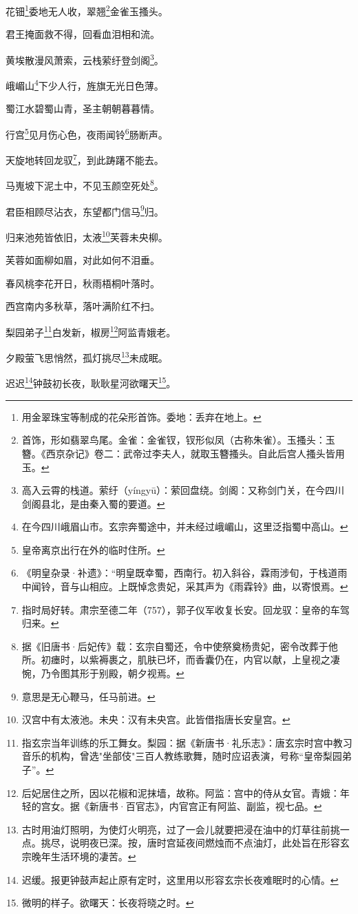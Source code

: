 \documentclass[UTF8]{ctexart}
\begin{document}
花钿\footnote{用金翠珠宝等制成的花朵形首饰。委地：丢弃在地上。}委地无人收，翠翘\footnote{首饰，形如翡翠鸟尾。金雀：金雀钗，钗形似凤（古称朱雀）。玉搔头：玉簪。《西京杂记》卷二：武帝过李夫人，就取玉簪搔头。自此后宫人搔头皆用玉。}金雀玉搔头。

君王掩面救不得，回看血泪相和流。

黄埃散漫风萧索，云栈萦纡登剑阁\footnote{高入云霄的栈道。萦纡（yíngyū）：萦回盘绕。剑阁：又称剑门关，在今四川剑阁县北，是由秦入蜀的要道。}。

峨嵋山\footnote{在今四川峨眉山市。玄宗奔蜀途中，并未经过峨嵋山，这里泛指蜀中高山。}下少人行，旌旗无光日色薄。

蜀江水碧蜀山青，圣主朝朝暮暮情。

行宫\footnote{皇帝离京出行在外的临时住所。}见月伤心色，夜雨闻铃\footnote{《明皇杂录·补遗》：“明皇既幸蜀，西南行。初入斜谷，霖雨涉旬，于栈道雨中闻铃，音与山相应。上既悼念贵妃，采其声为《雨霖铃》曲，以寄恨焉。}肠断声。

天旋地转回龙驭\footnote{指时局好转。肃宗至德二年（757），郭子仪军收复长安。回龙驭：皇帝的车驾归来。}，到此踌躇不能去。

马嵬坡下泥土中，不见玉颜空死处\footnote{据《旧唐书·后妃传》载：玄宗自蜀还，令中使祭奠杨贵妃，密令改葬于他所。初瘗时，以紫褥裹之，肌肤已坏，而香囊仍在，内官以献，上皇视之凄惋，乃令图其形于别殿，朝夕视焉。}。

君臣相顾尽沾衣，东望都门信马\footnote{意思是无心鞭马，任马前进。}归。

归来池苑皆依旧，太液\footnote{汉宫中有太液池。未央：汉有未央宫。此皆借指唐长安皇宫。}芙蓉未央柳。

芙蓉如面柳如眉，对此如何不泪垂。

春风桃李花开日，秋雨梧桐叶落时。

西宫南内多秋草，落叶满阶红不扫。

梨园弟子\footnote{指玄宗当年训练的乐工舞女。梨园：据《新唐书·礼乐志》：唐玄宗时宫中教习音乐的机构，曾选"坐部伎"三百人教练歌舞，随时应诏表演，号称“皇帝梨园弟子”。}白发新，椒房\footnote{后妃居住之所，因以花椒和泥抹墙，故称。阿监：宫中的侍从女官。青娥：年轻的宫女。据《新唐书·百官志》，内官宫正有阿监、副监，视七品。}阿监青娥老。

夕殿萤飞思悄然，孤灯挑尽\footnote{古时用油灯照明，为使灯火明亮，过了一会儿就要把浸在油中的灯草往前挑一点。挑尽，说明夜已深。按，唐时宫延夜间燃烛而不点油灯，此处旨在形容玄宗晚年生活环境的凄苦。}未成眠。

迟迟\footnote{迟缓。报更钟鼓声起止原有定时，这里用以形容玄宗长夜难眠时的心情。}钟鼓初长夜，耿耿星河欲曙天\footnote{微明的样子。欲曙天：长夜将晓之时。}。
\end{document}
